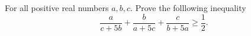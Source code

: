 For all positive real numbers $a, b,c.$ Prove the folllowing inequality$$\frac{a}{c+5b}+\frac{b}{a+5c}+\frac{c}{b+5a}\geq\frac{1}{2}.$$